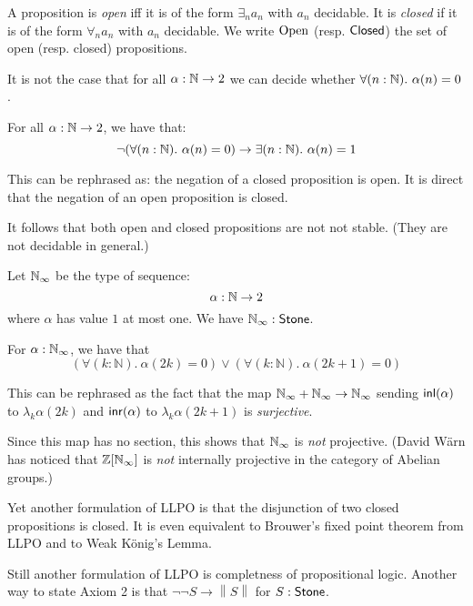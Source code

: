 \newcommand\norm[1]{\left\lVert #1 \right\rVert}


A proposition is {\em open} iff it is of the form $\exists_n a_n$ with $a_n$ decidable.
It is {\em closed} if it is of the form $\forall_n a_n$ with $a_n$ decidable.
We write $\mathrm{Open}$ (resp. $\mathsf{Closed}$) the set of open (resp. closed) propositions.


\begin{theorem}
   It is not the case that for all $\alpha:\mathbb{N}\to 2$ we can decide whether $\forall (n:\mathbb{N}).\ \alpha(n)=0$.
\end{theorem}

\begin{theorem}
  For all $\alpha:\mathbb{N}\to 2$, we have that:
   \[\neg(\forall (n:\mathbb{N}).\ \alpha(n)=0) \to \exists (n:\mathbb{N}).\ \alpha(n)=1\]
\end{theorem}

This can be rephrased as: the negation of a closed proposition is open. It is direct that the negation
of an open proposition is closed.

It follows that both open and closed propositions are not not stable. (They are not decidable in general.)

\begin{definition}
Let $\mathbb{N}_{\infty}$ be the type of sequence:
\[\alpha:\mathbb{N}\to 2\]
where $\alpha$ has value $1$ at most one. We have $\mathbb{N}_{\infty}:\mathsf{Stone}$.
\end{definition}

\begin{theorem}
  For $\alpha:\mathbb {\mathbb{N}_{\infty}}$, 
  we have that 
  \begin{equation}\label{eqnLLPO}
    \left(\forall (k:\mathbb N).\ \alpha(2k) = 0 \right) \vee \left(\forall (k:\mathbb N).\ \alpha(2k+1) = 0\right)
  \end{equation}
\end{theorem}

This can be rephrased as the fact that the map $\mathbb{N}_{\infty}+\mathbb{N}_{\infty}\rightarrow \mathbb{N}_{\infty}$ sending $\mathsf{inl}(\alpha)$ to $\lambda_k \alpha(2k)$
and $\mathsf{inr}(\alpha)$ to $\lambda_k \alpha(2k+1)$ is {\em surjective}.

\medskip

Since this map has no section, this shows that $\mathbb{N}_{\infty}$ is {\em not} projective.
(David W\"arn has noticed that $\mathbb{Z}[\mathbb{N}_{\infty}]$ is {\em not} internally projective in the category of
Abelian groups.)

\medskip

 Yet another formulation of LLPO is that the disjunction of two closed propositions is closed.
 It is even equivalent to Brouwer's fixed point theorem from LLPO and to Weak K\"onig's Lemma.

Still another formulation of LLPO is completness of propositional logic. Another way to state
Axiom 2 is that $\neg\neg S\rightarrow \norm{S}$ for $S:\mathsf{Stone}$.


 
